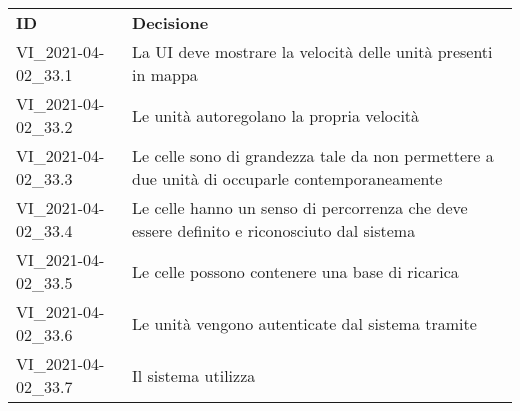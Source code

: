 \documentclass[]{article}
\begin{document}
	\begin{table} [h!]
		\begin{center}
			\begin{tabular} { m{2cm} m{14cm} }
				\rowcolor{lightgray}
				\textbf{ID} & \textbf{Decisione}\\
			VI\_2021-04-02\_33.1 & La UI deve mostrare la velocità delle unità presenti in mappa \\
			VI\_2021-04-02\_33.2 & Le unità autoregolano la propria velocità \\
			VI\_2021-04-02\_33.3 & Le celle sono di grandezza tale da non permettere a due unità di occuparle contemporaneamente \\
					VI\_2021-04-02\_33.4 & Le celle hanno un senso di percorrenza che deve essere definito e riconosciuto dal sistema \\
					VI\_2021-04-02\_33.5 & Le celle possono contenere una base di ricarica \\
					VI\_2021-04-02\_33.6 & Le unità vengono autenticate dal sistema tramite \glock{UUID} \\
					VI\_2021-04-02\_33.7 & Il sistema utilizza \glock{wss}\\
			\end{tabular}
		\end{center}
	\end{table}
\end{document}
